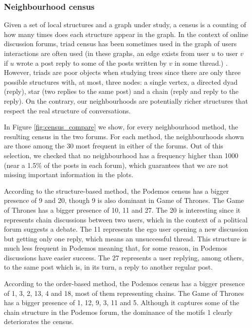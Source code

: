 \documentclass[conference]{IEEEtran}
\begin{document}
\subsubsection{Neighbourhood census}
Given a set of local structures and a graph under study, a census is a counting of how many times does each structure appear in the graph. In the context of online discussion forums, triad census has been sometimes used in the graph of users interactions are often used (in these graphs, an edge exists from user $u$ to user $v$ if $u$ wrote a post reply to some of the posts written by $v$ in some thread.) \cite{Adamic2008, Lumbreras2013}. However, triads are poor objects when studying trees since there are only three possible structures with, at most, three nodes: a single vertex, a directed dyad (reply), star (two replies to the same post) and a chain (reply and reply to the reply). On the contrary, our neighbourhoods are potentially richer structures that respect the real structure of conversations.

In Figure \ref{fig:census_compare} we show, for every neighbourhood method, the resulting census in the two forums. For each method, the neighbourhoods shown are those among the 30 most frequent in either of the forums. Out of this selection, we checked that no neighbourhood has a frequency higher than 1000 (near a 1.5\% of the posts in each forum), which guarantees that we are not missing important information in the plots. 

According to the structure-based method, the Podemos census has a bigger presence of 9 and 20, though 9 is also dominant in Game of Thrones. The Game of Thrones has a bigger presence of 10, 11 and 27. The 20 is interesting since it represents chain discussions between two users, which in the context of a political forum suggests a debate. The 11 represents the ego user opening a new discussion but getting only one reply, which means an unsuccessful thread. This structure is much less frequent in Podemos meaning that, for some reason, in Podemos discussions have easier success. The 27 represents a user replying, among others, to the same post which is, in its turn, a reply to another regular post.

According to the order-based method, the Podemos census has a bigger presence of 1, 3, 2, 13, 4 and 18, most of them representing chains. The Game of Thrones has a bigger presence of 1, 12, 9, 3, 11 and 5. Although it captures some of the chain structure in the Podemos forum, the dominance of the motifs 1 clearly deteriorates the census.
\end{document}
